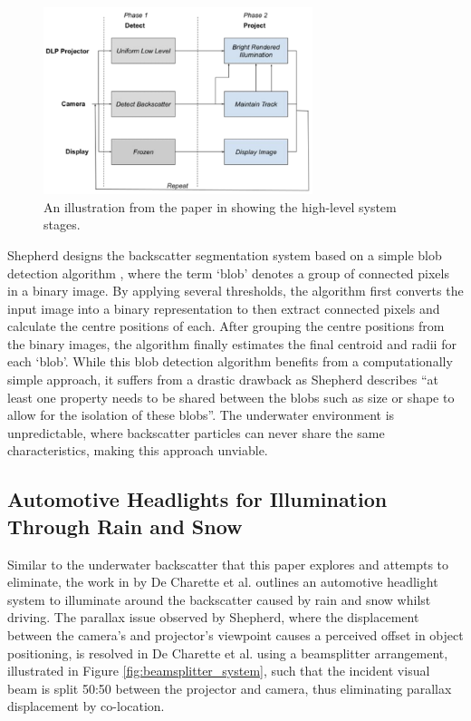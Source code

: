 \begin{figure}[H]
    \centering
    \includegraphics[width=0.7\textwidth]{assets/shepherd_fig6_system.png}
    \caption{An illustration from the paper in \cite{katieshepherdMachineVisionBased2023} showing the high-level system stages.}
    \label{fig:shepherd_system_stages}
\end{figure}

Shepherd designs the backscatter segmentation system based on a simple blob detection algorithm \cite{opencvOpenCVCvSimpleBlobDetector}, where the term `blob' denotes a group of connected pixels in a binary image. By applying several thresholds, the algorithm first converts the input image into a binary representation to then extract connected pixels and calculate the centre positions of each. After grouping the centre positions from the binary images, the algorithm finally estimates the final centroid and radii for each `blob'. While this blob detection algorithm benefits from a computationally simple approach, it suffers from a drastic drawback as Shepherd describes ``at least one property needs to be shared between the blobs such as size or shape to allow for the isolation of these blobs''. The underwater environment is unpredictable, where backscatter particles can never share the same characteristics, making this approach unviable.

\subsection{Automotive Headlights for Illumination Through Rain and Snow}
\label{autolights}

Similar to the underwater backscatter that this paper explores and attempts to eliminate, the work in \cite{decharetteFastReactiveControl2012} by De Charette et al. outlines an automotive headlight system to illuminate around the backscatter caused by rain and snow whilst driving. The parallax issue observed by Shepherd, where the displacement between the camera's and projector's viewpoint causes a perceived offset in object positioning, is resolved in De Charette et al. using a beamsplitter arrangement, illustrated in Figure \ref{fig:beamsplitter_system}, such that the incident visual beam is split 50:50 between the projector and camera, thus eliminating parallax displacement by co-location.

